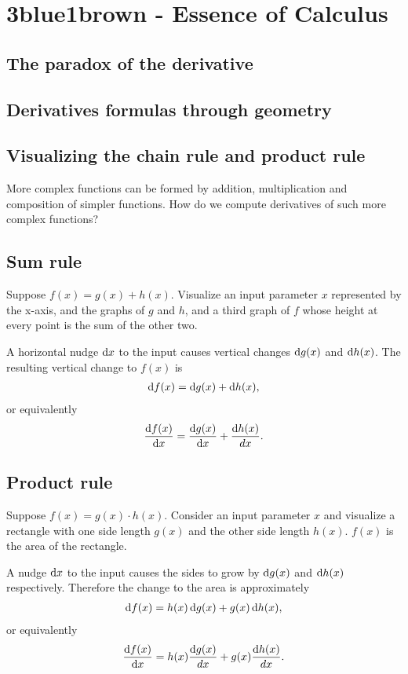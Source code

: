 \newcommand{\pzpx}{\frac{\partial z}{\partial x}}
\newcommand{\pzpy}{\frac{\partial z}{\partial y}}


\section{3blue1brown - Essence of Calculus}
\subsection{The paradox of the derivative}
\subsection{Derivatives formulas through geometry}
\subsection{Visualizing the chain rule and product rule}

More complex functions can be formed by addition, multiplication and
composition of simpler functions. How do we compute derivatives of such more
complex functions?

\subsection{Sum rule}
Suppose $f(x) = g(x) + h(x)$. Visualize an input parameter $x$ represented by
the x-axis, and the graphs of $g$ and $h$, and a third graph of $f$ whose
height at every point is the sum of the other two.

A horizontal nudge $\dx$ to the input causes vertical changes $\d g(x)$ and
$\d h(x)$. The resulting vertical change to $f(x)$ is
\begin{align*}
  \d f(x) = \d g(x) + \d h(x),
\end{align*}
or equivalently
\begin{align*}
  \frac{\d f(x)}{\dx} = \frac{\d g(x)}{\dx} + \frac{\d h(x)}{dx}.
\end{align*}


\newpage
\subsection{Product rule}
Suppose $f(x) = g(x) \cdot h(x)$. Consider an input parameter $x$ and visualize a
rectangle with one side length $g(x)$ and the other side length $h(x)$. $f(x)$
is the area of the rectangle.

A nudge $\dx$ to the input causes the sides to grow by $\d g(x)$ and $\d h(x)$
respectively. Therefore the change to the area is approximately
\begin{align*}
  \d f(x) = h(x) \d g(x) + g(x) \d h(x),
\end{align*}
or equivalently
\begin{align*}
  \frac{\d f(x)}{\dx} = h(x) \frac{\d g(x)}{dx} + g(x) \frac{\d h(x)}{dx}.
\end{align*}


